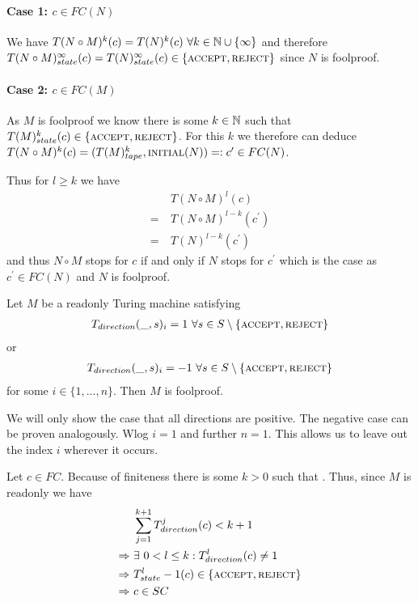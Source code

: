 \paragraph{Case 1: $c \in FC(N)$}
We have
$T(N \circ M)^k (c) = T(N)^k (c) ~\forall k \in \mathbb{N} \cup \{\infty\}$
and therefore $T(N \circ M)_{state}^\infty(c) = T(N)_{state}^\infty(c) \in \{\text{\scshape{accept}},\text{\scshape{reject}}\}$
since $N$ is foolproof.
\paragraph{Case 2: $c \in FC(M)$}
As $M$ is foolproof we know there is some $k \in \mathbb{N}$ such that $T(M)_{state}^k(c) \in \{\text{\scshape{accept}},\text{\scshape{reject}}\}$.
For this $k$ we therefore can deduce
$T(N \circ M)^k(c) = (T(M)_{tape}^k,\text{\scshape{initial}}(N)) =: c^\prime \in FC(N)$.

Thus for $l \geq k$ we have
\begin{align*}
	&T(N \circ M)^l(c) \\
	=~&T(N \circ M)^{l-k}(c^\prime) \\
	=~&T(N)^{l-k}(c^\prime)
\end{align*}
and thus $N \circ M$ stops for $c$ if and only if $N$ stops for $c^\prime$ which is the case as $c^\prime \in FC(N)$ and $N$ is foolproof.
\endproof

\begin{Lemma}
	Let $M$ be a readonly Turing machine satisfying
	\begin{align*}
		T_{direction} (\_,s)_i = 1~\forall s \in S \setminus \{\text{\scshape{accept}},\text{\scshape{reject}}\}
	\end{align*}
	or
	\begin{align*}
		T_{direction} (\_,s)_i = -1~\forall s \in S \setminus \{\text{\scshape{accept}},\text{\scshape{reject}}\}
	\end{align*}
	for some $i \in \{1,...,n\}$.
	Then $M$ is foolproof.
\end{Lemma}
\proof
We will only show the case that all directions are positive. The negative case can be proven analogously.
Wlog $i=1$ and further $n=1$. This allows us to leave out the index $i$ wherever it occurs.

Let $c \in FC$. Because of finiteness there is some $k > 0$ such that .
Thus, since $M$ is readonly we have
\begin{align*}
	&\sum_{j=1}^{k+1} T_{direction}^j (c) < k+1 \\
	\Rightarrow~&\exists~0 < l \leq k: T_{direction}^l (c) \neq 1 \\
	\Rightarrow~&T_{state}^l-1 (c) \in \{\text{\scshape{accept}},\text{\scshape{reject}}\} \\
	\Rightarrow~&c \in SC
\end{align*}
\endproof

